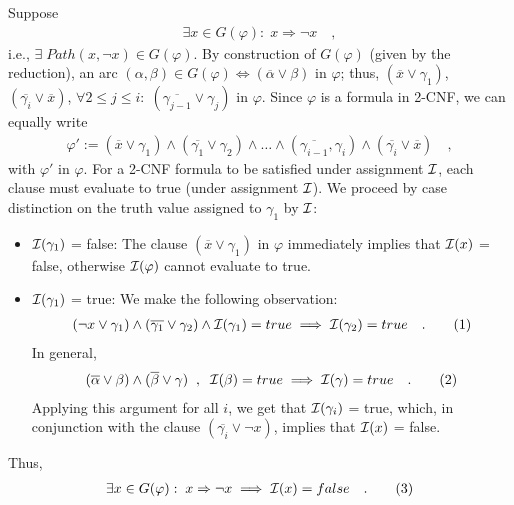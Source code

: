 \documentclass [11pt]{article}
\newcommand{\Ra}{\Rightarrow}
\newcommand{\compl}[1]{\overline{#1}}
\renewcommand{\phi}{\varphi}
\def\ox{\neg x}
\def\oa{\overline{\alpha}}
\def\ob{\overline{\beta}}
\def\b{\beta}
\def\g{\gamma}
\newcommand\numberthis{\addtocounter{equation}{1}\tag{\theequation}}
\newcommand\neqn[1]{\numberthis\label{eqn:#1}}
\begin{document}
\bigskip
\noindent
Suppose 
\begin{align}
\exists x \in G(\phi):\;x \Ra  \ox \quad ,
\end{align}
i.e., $\exists\; Path(x, \ox) \in G(\phi)$.
By construction of $G(\phi)$ (given by the reduction), an arc $(\alpha, \beta) \in G(\phi) \Leftrightarrow (\compl{\alpha} \lor \beta)$ in $\phi$; thus, $(\compl{x} \lor \g_1)$, $(\compl{\g_i} \lor \compl{x})$, $\forall 2 \leq j \leq i:\;(\compl{\g_{j-1}} \lor \g_j)$  in $\phi$. Since $\phi$ is a formula in 2-CNF, we can equally write 
\begin{align}
\phi' := (\compl{x} \lor \g_1) \land (\compl{\g_1} \lor \g_2) \land \dots \land (\compl{\g_{i-1}}, \g_i) \land (\compl{\g_i} \lor \compl{x}) \quad ,
\end{align}
with $\phi'$ in $\phi$. For a 2-CNF formula to be satisfied under assignment ${\cal I}$, each clause must evaluate to true (under assignment ${\cal I}$). We proceed by case distinction on the truth value assigned to $\g_1$ by ${\cal I}$:
\begin{itemize}
\item ${\cal I}(\g_1)$ = false: The clause $(\compl{x} \lor \g_1)$ in $\phi$ immediately implies that ${\cal I}(x)$ = false, otherwise ${\cal I}(\phi)$ cannot evaluate to true.
\item ${\cal I}(\g_1)$ = true: We make the following observation:
\begin{align}
(\ox \lor \g_1) \land (\compl{\g_1} \lor \g_2) \land {\cal I}(\g_1) = true \implies {\cal I}(\g_2) = true \quad . \neqn{observation}
\end{align}
In general, 
\begin{align}
(\oa \lor \b) \land (\ob \lor \g)\;\;,\;\;{\cal I}(\b) = true \implies {\cal I}(\g) = true \quad . \neqn{observation} 
\end{align}
Applying this argument for all $i$, we get that ${\cal I}(\g_i)$ = true, which, in conjunction with the clause $(\compl{\g_i} \lor \ox)$, implies that ${\cal I}(x)$ = false.
\end{itemize}
Thus, 
\begin{align}
\exists x \in G(\phi):\;x \Ra  \ox \implies {\cal I}(x) = false \quad . \neqn{res1}
\end{align}
\end{document}
